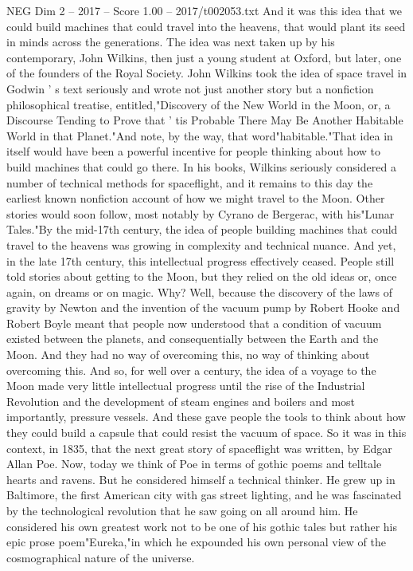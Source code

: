 \begin{textsample}{NEG Dim 2 – 2017 – Score 1.00 – 2017/t002053.txt}
And it was this idea that we could build machines that could travel into the heavens, that would plant its seed in minds across the generations.
The idea was next taken up by his contemporary, John Wilkins, then just a young student at Oxford, but later, one of the founders of the Royal Society.
John Wilkins took the idea of space travel in Godwin ' s text seriously and wrote not just another story but a nonfiction philosophical treatise, entitled,"Discovery of the New World in the Moon, or, a Discourse Tending to Prove that ' tis Probable There May Be Another Habitable World in that Planet."And note, by the way, that word"habitable."That idea in itself would have been a powerful incentive for people thinking about how to build machines that could go there.
In his books, Wilkins seriously considered a number of technical methods for spaceflight, and it remains to this day the earliest known nonfiction account of how we might travel to the Moon.
Other stories would soon follow, most notably by Cyrano de Bergerac, with his"Lunar Tales."By the mid-17th century, the idea of people building machines that could travel to the heavens was growing in complexity and technical nuance.
And yet, in the late 17th century, this intellectual progress effectively ceased.
People still told stories about getting to the Moon, but they relied on the old ideas or, once again, on dreams or on magic.
Why?
Well, because the discovery of the laws of gravity by Newton and the invention of the vacuum pump by Robert Hooke and Robert Boyle meant that people now understood that a condition of vacuum existed between the planets, and consequentially between the Earth and the Moon.
And they had no way of overcoming this, no way of thinking about overcoming this.
And so, for well over a century, the idea of a voyage to the Moon made very little intellectual progress until the rise of the Industrial Revolution and the development of steam engines and boilers and most importantly, pressure vessels.
And these gave people the tools to think about how they could build a capsule that could resist the vacuum of space.
So it was in this context, in 1835, that the next great story of spaceflight was written, by Edgar Allan Poe.
Now, today we think of Poe in terms of gothic poems and telltale hearts and ravens.
But he considered himself a technical thinker.
He grew up in Baltimore, the first American city with gas street lighting, and he was fascinated by the technological revolution that he saw going on all around him.
He considered his own greatest work not to be one of his gothic tales but rather his epic prose poem"Eureka,"in which he expounded his own personal view of the cosmographical nature of the universe.

\end{textsample}
